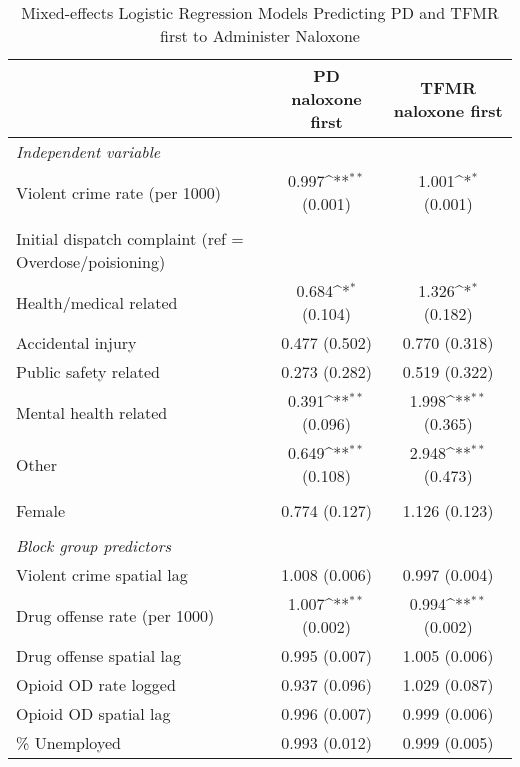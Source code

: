 \begin{table}[htbp]\centering
\def\sym#1{\ifmmode^{#1}\else\(^{#1}\)\fi}
\caption{Mixed-effects Logistic Regression Models Predicting PD and TFMR first to Administer Naloxone}
\begin{adjustbox}{max width=\linewidth}\begin{tabular}{l*{2}{c}}
\toprule
                &\multicolumn{1}{c}{PD naloxone first}&\multicolumn{1}{c}{TFMR naloxone first}\\
\midrule
\emph{Independent variable}&                 &                 \\
Violent crime rate (per 1000)&0.997\sym{**} (0.001)        &1.001\sym{*} (0.001)        \\
\vspace{.05em} \\
Initial dispatch complaint (ref = Overdose/poisioning)&                 &                 \\
Health/medical related&0.684\sym{*} (0.104)        &1.326\sym{*} (0.182)        \\
Accidental injury&0.477 (0.502)        &0.770 (0.318)        \\
Public safety related&0.273 (0.282)        &0.519 (0.322)        \\
Mental health related&0.391\sym{**} (0.096)        &1.998\sym{**} (0.365)        \\
Other           &0.649\sym{**} (0.108)        &2.948\sym{**} (0.473)        \\
\vspace{.05em} \\
Female          &0.774 (0.127)        &1.126 (0.123)        \\
\vspace{.05em} \\
\emph{Block group predictors}&                 &                 \\
Violent crime spatial lag&1.008 (0.006)        &0.997 (0.004)        \\
Drug offense rate (per 1000)&1.007\sym{**} (0.002)        &0.994\sym{**} (0.002)        \\
Drug offense spatial lag&0.995 (0.007)        &1.005 (0.006)        \\
Opioid OD rate logged&0.937 (0.096)        &1.029 (0.087)        \\
Opioid OD spatial lag&0.996 (0.007)        &0.999 (0.006)        \\
\% Unemployed   &0.993 (0.012)        &0.999 (0.005)        \\

\end{tabular}
\end{adjustbox}
\end{table}
